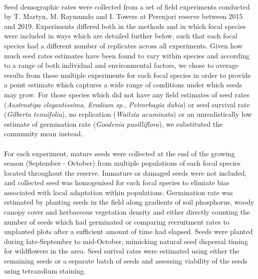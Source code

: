 \documentclass[a4,12pt]{article}
\begin{document}
        \paragraph{}
        Seed demographic rates were collected from a set of field experiments conducted by T. Martyn, M. Raymundo and I. Towers at Perenjori reserve between 2015 and 2019. Experiments differed both in the methods and in which focal species were included in ways which are detailed further below, such that each focal species had a different number of replicates across all experiments. Given how much seed rates estimates have been found to vary within species and according to a range of both individual and environmental factors, we chose to average results from these multiple experiments for each focal species in order to provide a point estimate which captures a wide range of conditions under which seeds may grow. For those species which did not have any field estimates of seed rates (\textit{Austrostipa elegantissima}, \textit{Erodium sp.}, \textit{Petrorhagia dubia}) or seed survival rate (\textit{Gilberta tenuifolia}), no replication (\textit{Waitzia acuminata}) or an unrealistically low estimate of germination rate (\textit{Goodenia pusilliflora}), we substituted the community mean instead. 

        \paragraph{}
        For each experiment, mature seeds were collected at the end of the growing season (September - October) from multiple populations of each focal species located throughout the reserve. Immature or damaged seeds were not included, and collected seed was homogenised for each focal species to elimiate bias associated with local adaptation within populations. Germination rate was estimated by planting seeds in the field along gradients of soil phosphorus, woody canopy cover and herbaceous vegetation density and either directly counting the number of seeds which had germinated or comparing recruitment rates to unplanted plots after a sufficient amount of time had elapsed. Seeds were planted during late-September to mid-October, mimicking natural seed dispersal timing for wildflowers in the area. Seed surival rates were estimated using either the remaining seeds or a separate batch of seeds and assessing viability of the seeds using tetrazolium staining. 
\end{document}

